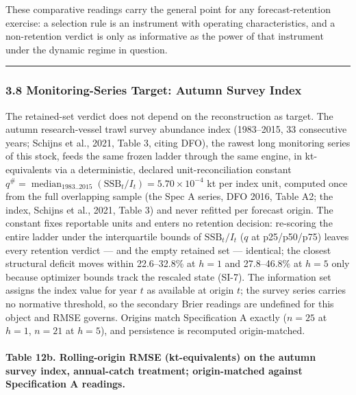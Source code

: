 \documentclass[11pt]{article}
\begin{document}
These comparative readings carry the general point for any
forecast-retention exercise: a selection rule is an instrument with
operating characteristics, and a non-retention verdict is only as
informative as the power of that instrument under the dynamic regime in
question.

\begin{center}\rule{0.5\linewidth}{0.5pt}\end{center}

\subsubsection{3.8 Monitoring-Series Target: Autumn Survey
Index}\label{monitoring-series-target-autumn-survey-index}

The retained-set verdict does not depend on the reconstruction as
target. The autumn research-vessel trawl survey abundance index
(1983--2015, 33 consecutive years; Schijns et al., 2021, Table 3, citing
DFO), the rawest long monitoring series of this stock, feeds the same
frozen ladder through the same engine, in kt-equivalents via a
deterministic, declared unit-reconciliation constant
\(q^{\#} = \operatorname{median}_{1983..2015}(\mathrm{SSB}_t / I_t) = 5.70 \times 10^{-4}\)
kt per index unit, computed once from the full overlapping sample (the
Spec A series, DFO 2016, Table A2; the index, Schijns et al., 2021,
Table 3) and never refitted per forecast origin. The constant fixes
reportable units and enters no retention decision: re-scoring the entire
ladder under the interquartile bounds of \(\mathrm{SSB}_t/I_t\) (\(q\)
at p25/p50/p75) leaves every retention verdict --- and the empty
retained set --- identical; the closest structural deficit moves within
22.6--32.8\% at \(h=1\) and 27.8--46.8\% at \(h=5\) only because
optimizer bounds track the rescaled state (SI-7). The information set
assigns the index value for year \(t\) as available at origin \(t\); the
survey series carries no normative threshold, so the secondary Brier
readings are undefined for this object and RMSE governs. Origins match
Specification A exactly (\(n = 25\) at \(h=1\), \(n = 21\) at \(h=5\)),
and persistence is recomputed origin-matched.

\paragraph{Table 12b. Rolling-origin RMSE (kt-equivalents) on the autumn
survey index, annual-catch treatment; origin-matched against
Specification A
readings.}\label{table-12b.-rolling-origin-rmse-kt-equivalents-on-the-autumn-survey-index-annual-catch-treatment-origin-matched-against-specification-a-readings.}
\end{document}

